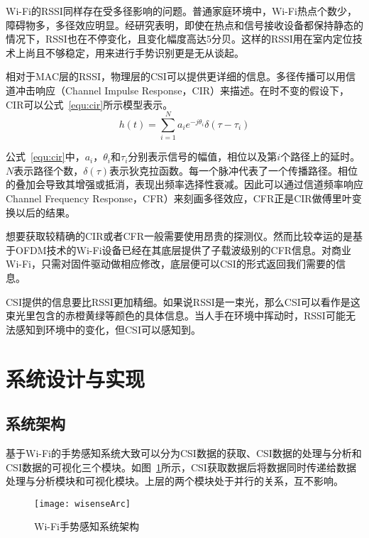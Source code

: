 Wi-Fi的RSSI同样存在受多径影响的问题。普通家庭环境中，Wi-Fi热点个数少，障碍物多，多径效应明显。经研究表明，即使在热点和信号接收设备都保持静态的情况下，RSSI也在不停变化，且变化幅度高达5分贝。这样的RSSI用在室内定位技术上尚且不够稳定，用来进行手势识别更是无从谈起。

相对于MAC层的RSSI，物理层的CSI可以提供更详细的信息。多径传播可以用信道冲击响应（Channel Impulse Response，CIR）来描述。在时不变的假设下，CIR可以公式~\ref{equ:cir}所示模型表示。
\begin{equation}
\label{equ:cir}
h\left( t \right) = \sum\limits_{i = 1}^N {{a_i}} {e^{ - j{\theta _i}}}\delta \left( {\tau  - {\tau _i}} \right)
\end{equation}

公式~\ref{equ:cir}中，$a_i$，$\theta _i$和$\tau _i$分别表示信号的幅值，相位以及第$i$个路径上的延时。$N$表示路径个数，$\delta \left( \tau \right)$表示狄克拉函数。每一个脉冲代表了一个传播路径。相位的叠加会导致其增强或抵消，表现出频率选择性衰减。因此可以通过信道频率响应Channel Frequency Response，CFR）来刻画多径效应，CFR正是CIR做傅里叶变换以后的结果。

想要获取较精确的CIR或者CFR一般需要使用昂贵的探测仪。然而比较幸运的是基于OFDM技术的Wi-Fi设备已经在其底层提供了子载波级别的CFR信息。对商业Wi-Fi，只需对固件驱动做相应修改，底层便可以CSI的形式返回我们需要的信息。

CSI提供的信息要比RSSI更加精细。如果说RSSI是一束光，那么CSI可以看作是这束光里包含的赤橙黄绿等颜色的具体信息。当人手在环境中挥动时，RSSI可能无法感知到环境中的变化，但CSI可以感知到。

\section{系统设计与实现}
\subsection{系统架构}
基于Wi-Fi的手势感知系统大致可以分为CSI数据的获取、CSI数据的处理与分析和CSI数据的可视化三个模块。如图~\ref{fig:wisenseArc}所示，CSI获取数据后将数据同时传递给数据处理与分析模块和可视化模块。上层的两个模块处于并行的关系，互不影响。

\begin{figure}[htbp] %
  \centering
  \texttt{[image: wisenseArc]}
  \caption[Wi-Fi手势感知系统架构]{Wi-Fi手势感知系统架构}
  \label{fig:wisenseArc}
\end{figure}

